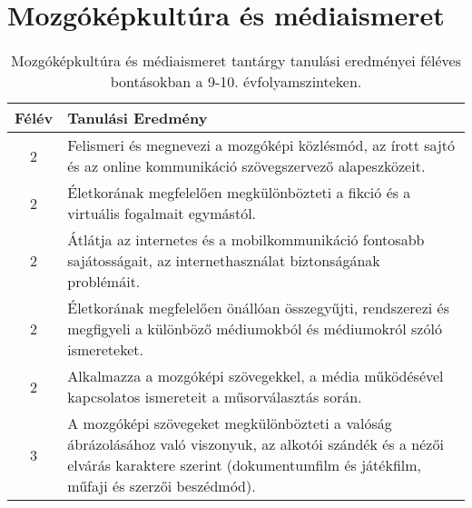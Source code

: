         \section{Mozgóképkultúra és médiaismeret}

       
           \begin{longtable}{c | p{12cm} }
            \caption[Mozgóképkultúra és médiaismeret 9-10.]{Mozgóképkultúra és médiaismeret tantárgy tanulási eredményei féléves bontásokban a 9-10. évfolyamszinteken. }  \\

            \textbf{Félév} & \textbf{Tanulási Eredmény} \\
            \hline
            \endhead
                                
                                          2 &  Felismeri és megnevezi a mozgóképi közlésmód, az írott sajtó és az online kommunikáció szövegszervező alapeszközeit. \\ \hline
                                          2 &  Életkorának megfelelően megkülönbözteti a fikció és a virtuális fogalmait egymástól.  \\ \hline
                                          2 &  Átlátja az internetes és a mobilkommunikáció fontosabb sajátosságait, az internethasználat biztonságának problémáit. \\ \hline
                                          2 &  Életkorának megfelelően önállóan összegyűjti, rendszerezi és megfigyeli a különböző  médiumokból és médiumokról szóló ismereteket. \\ \hline
                                          2 &  Alkalmazza a mozgóképi szövegekkel, a média működésével kapcsolatos ismereteit a műsorválasztás során.  \\ \hline
                                      
                                
                                          3 &  A mozgóképi szövegeket megkülönbözteti a valóság ábrázolásához való viszonyuk, az alkotói szándék és a nézői elvárás karaktere szerint (dokumentumfilm és játékfilm, műfaji és szerzői beszédmód). \\ \hline
                                      

\end{longtable}
